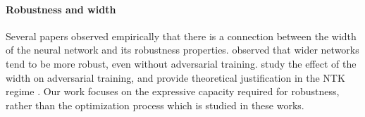 \paragraph{Robustness and width}
Several papers observed empirically that there is a connection between the width of the neural network and its robustness properties. \cite{madry2017towards} observed that wider networks tend to be more robust, even without adversarial training. \cite{wu2021wider,zhu2022robustness} study the effect of the width on adversarial training, and provide theoretical justification in the NTK regime \citep{jacot2018neural,allen2019convergence,gao2019convergence}. Our work focuses on the expressive capacity required for robustness, rather than the optimization process which is studied in these works.